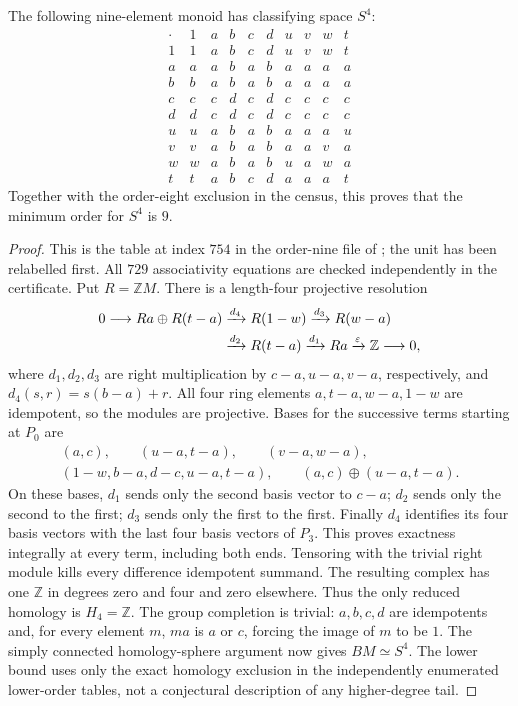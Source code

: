 \begin{proposition}\label{prop:B-S4-nine}
The following nine-element monoid has classifying space $S^4$:
\[
\begin{array}{c|ccccccccc}
 \cdot&1&a&b&c&d&u&v&w&t\\\hline
 1&1&a&b&c&d&u&v&w&t\\
 a&a&a&b&a&b&a&a&a&a\\
 b&b&a&b&a&b&a&a&a&a\\
 c&c&c&d&c&d&c&c&c&c\\
 d&d&c&d&c&d&c&c&c&c\\
 u&u&a&b&a&b&a&a&a&u\\
 v&v&a&b&a&b&a&a&v&a\\
 w&w&a&b&a&b&u&a&w&a\\
 t&t&a&b&c&d&a&a&a&t
\end{array}
\]
Together with the order-eight exclusion in the census, this proves
that the minimum order for $S^4$ is $9$.
\end{proposition}
\begin{proof}
This is the table at index $754$ in the order-nine file of
\cite{SweeneyData2026B}; the unit has been relabelled first.
All $729$ associativity equations are checked independently in the
certificate.  Put $R=\mathbb ZM$.  There is a length-four projective
resolution
\[
\begin{split}
0\longrightarrow Ra\oplus R(t-a)
 &\xrightarrow{d_4}R(1-w)\xrightarrow{d_3}R(w-a)\\
 &\xrightarrow{d_2}R(t-a)\xrightarrow{d_1}Ra
       \xrightarrow{\varepsilon}\mathbb Z\longrightarrow0,
\end{split}
\]
where $d_1,d_2,d_3$ are right multiplication by $c-a,u-a,v-a$,
respectively, and $d_4(s,r)=s(b-a)+r$.  All four ring elements
$a,t-a,w-a,1-w$ are idempotent, so the modules are projective.
Bases for the successive terms starting at $P_0$ are
\[
\begin{gathered}
 (a,c),\qquad(u-a,t-a),\qquad(v-a,w-a),\\
 (1-w,b-a,d-c,u-a,t-a),\qquad
 (a,c)\oplus(u-a,t-a).
\end{gathered}
\]
On these bases, $d_1$ sends only the second basis vector to
$c-a$; $d_2$ sends only the second to the first; $d_3$ sends
only the first to the first.  Finally $d_4$ identifies its four
basis vectors with the last four basis vectors of $P_3$.
This proves exactness integrally at every term, including both ends.
Tensoring with the trivial right module kills every difference
idempotent summand.  The resulting complex has one $\mathbb Z$
in degrees zero and four and zero elsewhere.  Thus the only reduced
homology is $H_4=\mathbb Z$.  The group completion is trivial:
$a,b,c,d$ are idempotents and, for every element $m$, $ma$ is
$a$ or $c$, forcing the image of $m$ to be $1$.
The simply connected homology-sphere argument now gives $BM\simeq S^4$.
The lower bound uses only the exact homology exclusion in the
independently enumerated lower-order tables, not a conjectural
description of any higher-degree tail.
\end{proof}

